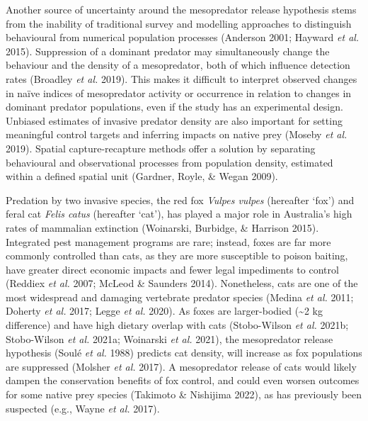 \documentclass[preprint, 3p, authoryear]{elsarticle} %
\begin{document}
Another source of uncertainty around the mesopredator release hypothesis stems from the inability of traditional survey and modelling approaches to distinguish behavioural from numerical population processes (Anderson 2001; Hayward \emph{et al.} 2015). Suppression of a dominant predator may simultaneously change the behaviour and the density of a mesopredator, both of which influence detection rates (Broadley \emph{et al.} 2019). This makes it difficult to interpret observed changes in naïve indices of mesopredator activity or occurrence in relation to changes in dominant predator populations, even if the study has an experimental design. Unbiased estimates of invasive predator density are also important for setting meaningful control targets and inferring impacts on native prey (Moseby \emph{et al.} 2019). Spatial capture-recapture methods offer a solution by separating behavioural and observational processes from population density, estimated within a defined spatial unit (Gardner, Royle, \& Wegan 2009).

Predation by two invasive species, the red fox \emph{Vulpes vulpes} (hereafter `fox') and feral cat \emph{Felis catus} (hereafter `cat'), has played a major role in Australia's high rates of mammalian extinction (Woinarski, Burbidge, \& Harrison 2015). Integrated pest management programs are rare; instead, foxes are far more commonly controlled than cats, as they are more susceptible to poison baiting, have greater direct economic impacts and fewer legal impediments to control (Reddiex \emph{et al.} 2007; McLeod \& Saunders 2014). Nonetheless, cats are one of the most widespread and damaging vertebrate predator species (Medina \emph{et al.} 2011; Doherty \emph{et al.} 2017; Legge \emph{et al.} 2020). As foxes are larger-bodied (\textasciitilde2 kg difference) and have high dietary overlap with cats (Stobo-Wilson \emph{et al.} 2021b; Stobo-Wilson \emph{et al.} 2021a; Woinarski \emph{et al.} 2021), the mesopredator release hypothesis (Soulé \emph{et al.} 1988) predicts cat density, will increase as fox populations are suppressed (Molsher \emph{et al.} 2017). A mesopredator release of cats would likely dampen the conservation benefits of fox control, and could even worsen outcomes for some native prey species (Takimoto \& Nishijima 2022), as has previously been suspected (e.g., Wayne \emph{et al.} 2017).
\end{document}
